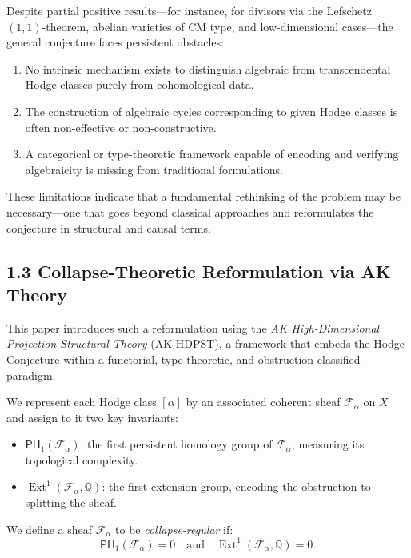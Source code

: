 \documentclass[11pt]{article}
\begin{document}
Despite partial positive results—for instance, for divisors via the Lefschetz $(1,1)$-theorem, abelian varieties of CM type, and low-dimensional cases—the general conjecture faces persistent obstacles:

\begin{enumerate}
  \item No intrinsic mechanism exists to distinguish algebraic from transcendental Hodge classes purely from cohomological data.
  \item The construction of algebraic cycles corresponding to given Hodge classes is often non-effective or non-constructive.
  \item A categorical or type-theoretic framework capable of encoding and verifying algebraicity is missing from traditional formulations.
\end{enumerate}

These limitations indicate that a fundamental rethinking of the problem may be necessary—one that goes beyond classical approaches and reformulates the conjecture in structural and causal terms.

\subsection{1.3 Collapse-Theoretic Reformulation via AK Theory}

This paper introduces such a reformulation using the \emph{AK High-Dimensional Projection Structural Theory} (AK-HDPST), a framework that embeds the Hodge Conjecture within a functorial, type-theoretic, and obstruction-classified paradigm.

We represent each Hodge class $[\alpha]$ by an associated coherent sheaf $\mathcal{F}_\alpha$ on $X$ and assign to it two key invariants:

\begin{itemize}
  \item $\mathsf{PH}_1(\mathcal{F}_\alpha)$: the first persistent homology group of $\mathcal{F}_\alpha$, measuring its topological complexity.
  \item $\operatorname{Ext}^1(\mathcal{F}_\alpha, \mathbb{Q})$: the first extension group, encoding the obstruction to splitting the sheaf.
\end{itemize}

We define a sheaf $\mathcal{F}_\alpha$ to be \emph{collapse-regular} if:
\[
\mathsf{PH}_1(\mathcal{F}_\alpha) = 0 \quad \text{and} \quad \operatorname{Ext}^1(\mathcal{F}_\alpha, \mathbb{Q}) = 0.
\]
\end{document}
